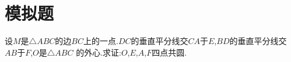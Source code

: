 \documentclass[question]{article}
\title{}
\author{}
\date{}
\begin{document}
\maketitle
\section{模拟题}{
设$M$是$\triangle ABC$的边$BC$上的一点.$DC$的垂直平分线交$CA$于$E$,$BD$的垂直平分线交$AB$于$F$,$O$是$\triangle ABC$ 的外心.求证:$O$,$E$,$A$,$F$四点共圆.
}
\end{document}
